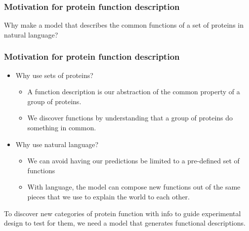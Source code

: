 \documentclass{beamer}
\begin{document}
\begin{frame}
\frametitle{Motivation for protein function description}
    Why make a model that describes the common functions of a set of proteins in natural language?
\end{frame}

\begin{frame}
\frametitle{Motivation for protein function description}

    \begin{itemize}
        \item Why use sets of proteins?\pause
            \begin{itemize}
                \item A function description is our abstraction of the common property of a group of proteins. \pause
                \item We discover functions by understanding that a group of proteins do something in common.\pause
            \end{itemize}
        \item Why use natural language?\pause
            \begin{itemize}
                \item We can avoid having our predictions be limited to a pre-defined set of functions\pause
                \item With language, the model can compose new functions out of the same pieces that we use to explain the world to each other.\pause
            \end{itemize}
    \end{itemize}
    To discover new categories of protein function with info to guide experimental design to test for them, we need a model that generates functional descriptions.
\end{frame}

\end{document}
